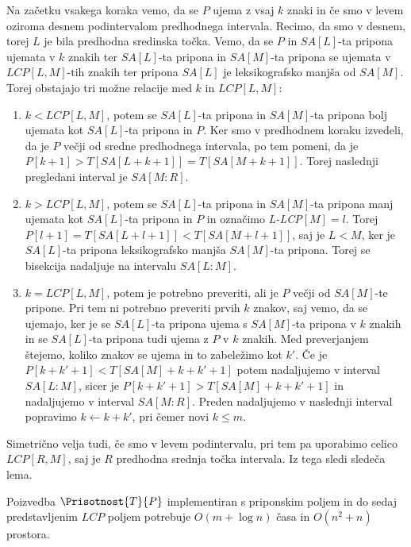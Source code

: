 Na začetku vsakega koraka vemo, da se $P$ ujema z vsaj $k$ znaki in če smo v levem oziroma desnem podintervalom predhodnega intervala. Recimo, da smo v desnem, torej $L$ je bila predhodna sredinska točka. Vemo, da se $P$ in $SA[L]$-ta pripona ujemata v $k$ znakih ter $SA[L]$-ta pripona in $SA[M]$-ta pripona se ujemata v $LCP[L,M]$-tih znakih ter pripona $SA[L]$ je leksikografsko manjša od $SA[M]$. Torej obstajajo tri možne relacije med $k$ in $LCP[L,M]$:
\begin{enumerate}
    \item $k<LCP[L,M]$, potem se $SA[L]$-ta pripona in $SA[M]$-ta pripona bolj ujemata kot $SA[L]$-ta pripona in $P$. Ker smo v predhodnem koraku izvedeli, da je $P$ večji od sredne predhodnega intervala, po tem pomeni, da je $P[k+1]>T[SA[L+k+1]]=T[SA[M+k+1]]$. Torej naslednji pregledani interval je $SA[M:R]$.
    \item $k>LCP[L,M]$, potem se $SA[L]$-ta pripona in $SA[M]$-ta pripona manj ujemata kot $SA[L]$-ta pripona in $P$ in označimo \textit{L-LCP}$[M]=l$. Torej $P[l+1]=T[SA[L+l+1]]<T[SA[M+l+1]]$, saj je $L<M$, ker je $SA[L]$-ta pripona leksikografsko manjša $SA[M]$-ta pripona. Torej se bisekcija nadaljuje na intervalu $SA[L:M]$.
    \item $k=LCP[L,M]$, potem je potrebno preveriti, ali je $P$ večji od $SA[M]$-te pripone. Pri tem ni potrebno preveriti prvih $k$ znakov, saj vemo, da se ujemajo, ker je se $SA[L]$-ta pripona ujema s $SA[M]$-ta pripona v $k$ znakih in se $SA[L]$-ta pripona tudi ujema z $P$ v $k$ znakih. Med preverjanjem štejemo, koliko znakov se ujema in to zabeležimo kot $k'$. Če je $P[k+k'+1]<T[SA[M]+k+k'+1]$ potem nadaljujemo v interval $SA[L:M]$, sicer je $P[k+k'+1]>T[SA[M]+k+k'+1]$ in nadaljujemo v interval $SA[M:R]$. Preden nadaljujemo v naslednji interval popravimo $k\leftarrow k+k'$, pri čemer novi $k\le m$.
\end{enumerate}
Simetrično velja tudi, če smo v levem podintervalu, pri tem pa uporabimo celico $LCP[R,M]$, saj je $R$ predhodna srednja točka intervala. Iz tega sledi sledeča lema.


\begin{lema}\label{lema:LCP}
    Poizvedba $\Prisotnost{T}{P}$ implementiran s priponskim poljem in do sedaj predstavljenim $LCP$ poljem potrebuje $O(m+\log{n})$ časa in $O(n^2 +n)$ prostora.
\end{lema}


